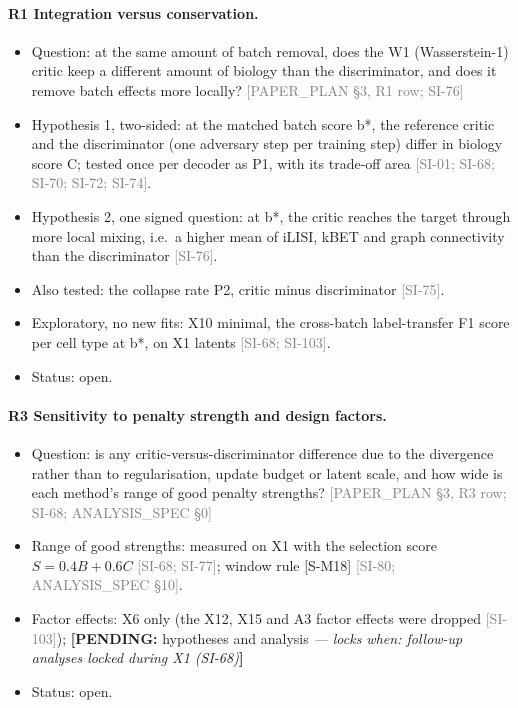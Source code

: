 \documentclass[11pt]{article}
\newcommand{\src}[1]{{\scriptsize\textcolor{gray}{[#1]}}}
\newcommand{\pending}[2]{{\color{BurntOrange}\textbf{[PENDING:} #1 \textit{--- locks when: #2}\textbf{]}}}
\begin{document}
\paragraph{R1 Integration versus conservation.}
\begin{itemize}
\item Question: at the same amount of batch removal, does the W1 (Wasserstein-1) critic keep a different amount of biology than the discriminator, and does it remove batch effects more locally? \src{PAPER\_PLAN \S3, R1 row; SI-76}
\item Hypothesis 1, two-sided: at the matched batch score b*, the reference critic and the discriminator (one adversary step per training step) differ in biology score C; tested once per decoder as P1, with its trade-off area \src{SI-01; SI-68; SI-70; SI-72; SI-74}.
\item Hypothesis 2, one signed question: at b*, the critic reaches the target through more local mixing, i.e.\ a higher mean of iLISI, kBET and graph connectivity than the discriminator \src{SI-76}.
\item Also tested: the collapse rate P2, critic minus discriminator \src{SI-75}.
\item Exploratory, no new fits: X10 minimal, the cross-batch label-transfer F1 score per cell type at b*, on X1 latents \src{SI-68; SI-103}.
\item Status: open.
\end{itemize}

\paragraph{R3 Sensitivity to penalty strength and design factors.}
\begin{itemize}
\item Question: is any critic-versus-discriminator difference due to the divergence rather than to regularisation, update budget or latent scale, and how wide is each method's range of good penalty strengths? \src{PAPER\_PLAN \S3, R3 row; SI-68; ANALYSIS\_SPEC \S0}
\item Range of good strengths: measured on X1 with the selection score $S = 0.4B + 0.6C$ \src{SI-68; SI-77}; window rule [S-M18] \src{SI-80; ANALYSIS\_SPEC \S10}.
\item Factor effects: X6 only (the X12, X15 and A3 factor effects were dropped \src{SI-103}); \pending{hypotheses and analysis}{follow-up analyses locked during X1 (SI-68)}
\item Status: open.
\end{itemize}
\end{document}
